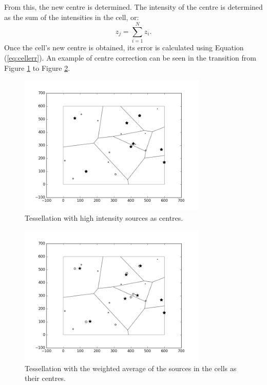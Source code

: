 From this, the new centre is determined. The intensity of the centre is determined as the sum of the intensities in the cell, or:
\begin{equation}
	z_j = \sum^N_{i=1} z_i.
\end{equation}
Once the cell's new centre is obtained, its error is calculated using Equation (\ref{eq:cellerr}). An example of centre correction can be seen in the transition from Figure \ref{fig:recen1} to Figure \ref{fig:recen2}.
\begin{figure}[H]
  \centering
  \includegraphics[width=0.8\textwidth]{Images/recentre1.png}
  \caption{Tessellation with high intensity sources as centres.}
  \label{fig:recen1}
\end{figure}
\begin{figure}[H]
  \centering
  \includegraphics[width=0.8\textwidth]{Images/recentre2.png}
  \caption{Tessellation with the weighted average of the sources in the cells as their centres.}
  \label{fig:recen2}
\end{figure}
